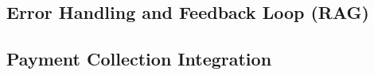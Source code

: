 
\subsection{Error Handling and Feedback Loop (RAG)}




\subsection{Payment Collection Integration}



